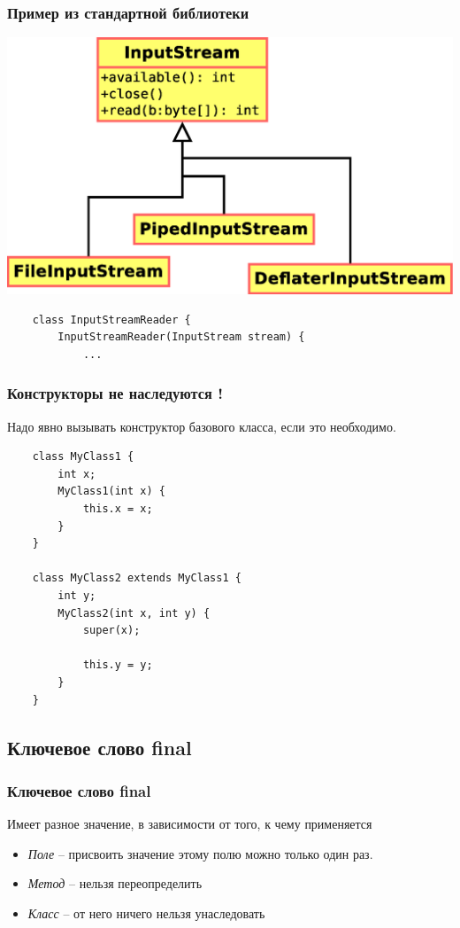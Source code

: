 \begin{frame}[fragile]
	\frametitle{Пример из стандартной библиотеки}

	\includegraphics[height=0.6\textheight]{lesson-4-Diagram6.eps}

	\medskip
	\begin{verbatim}
	class InputStreamReader {
	    InputStreamReader(InputStream stream) {
	        ...
	\end{verbatim}
\end{frame}

\begin{frame}[fragile]
	\frametitle{Конструкторы не наследуются !}

	\begin{large}
	Надо явно вызывать конструктор базового класса, если это необходимо.
	\medskip
	\begin{verbatim}
	class MyClass1 {
	    int x;
	    MyClass1(int x) {
	        this.x = x;
	    }
	}

	class MyClass2 extends MyClass1 {
	    int y;
	    MyClass2(int x, int y) {
	        super(x);

	        this.y = y;
	    }
	}
	\end{verbatim}
	\end{large}

\end{frame}

\subsection{Ключевое слово final}
\begin{frame}
	\frametitle{Ключевое слово final}

	\begin{Large}
	Имеет разное значение, в зависимости от того, к чему применяется
	\medskip
	\begin{itemize}
	\item{\emph{Поле} -- присвоить значение этому полю можно только один раз.}
	\item{\emph{Метод} -- нельзя переопределить}
	\item{\emph{Класс} -- от него ничего нельзя унаследовать}
	\end{itemize}
	\end{Large}
\end{frame}

